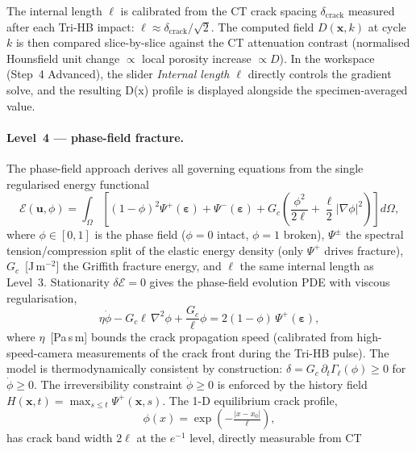\documentclass[11pt,a4paper,openany]{book}
\theoremstyle{handbook}
\begin{document}
The internal length $\ell$ is calibrated from the CT crack spacing
$\delta_{\mathrm{crack}}$ measured after each Tri-HB impact:
$\ell\approx\delta_{\mathrm{crack}}/\sqrt{2}$. The computed field $D(\mathbf{x},k)$
at cycle $k$ is then compared slice-by-slice against the CT attenuation contrast
(normalised Hounsfield unit change $\propto$ local porosity increase $\propto D$).
In the workspace (Step~4 Advanced), the slider \emph{Internal length $\ell$} directly
controls the gradient solve, and the resulting D(x) profile is displayed
alongside the specimen-averaged value.

\paragraph{Level~4 --- phase-field fracture.}
The phase-field approach derives all governing equations from the single
regularised energy functional~\cite{bourdin2000}
%
\begin{equation}
\mathcal{E}(\mathbf{u},\phi)=\int_\Omega\!\left[
(1-\phi)^2\Psi^+(\boldsymbol\varepsilon)+\Psi^-(\boldsymbol\varepsilon)
+G_c\!\left(\frac{\phi^2}{2\ell}+\frac{\ell}{2}|\nabla\phi|^2\right)
\right]d\Omega,
\label{eq:v6-pf}
\end{equation}
%
where $\phi\in[0,1]$ is the phase field ($\phi=0$ intact, $\phi=1$ broken),
$\Psi^\pm$ the spectral tension/compression split of the elastic energy density
(only $\Psi^+$ drives fracture), $G_c$~[J\,m$^{-2}$] the Griffith fracture energy,
and $\ell$ the same internal length as Level~3.  Stationarity
$\delta\mathcal{E}=0$ gives the phase-field evolution PDE with viscous
regularisation,
%
\begin{equation}
\eta\dot\phi-G_c\ell\,\nabla^2\phi+\frac{G_c}{\ell}\phi
=2(1-\phi)\,\Psi^+(\boldsymbol\varepsilon),
\label{eq:v6-pfpde}
\end{equation}
%
where $\eta$~[Pa\,s\,m] bounds the crack propagation speed (calibrated from
high-speed-camera measurements of the crack front during the Tri-HB pulse).
The model is thermodynamically consistent by construction:
$\delta=G_c\,\partial_t\Gamma_\ell(\phi)\ge0$ for $\dot\phi\ge0$.  The
irreversibility constraint $\dot\phi\ge0$ is enforced by the history field
$H(\mathbf{x},t)=\max_{s\le t}\Psi^+(\mathbf{x},s)$.  The 1-D equilibrium
crack profile,
%
\begin{equation}
\phi(x)=\exp\!\left(-\tfrac{|x-x_0|}{\ell}\right),
\label{eq:v6-phicrack}
\end{equation}
%
has crack band width $2\ell$ at the $e^{-1}$ level, directly measurable from CT
\end{document}
